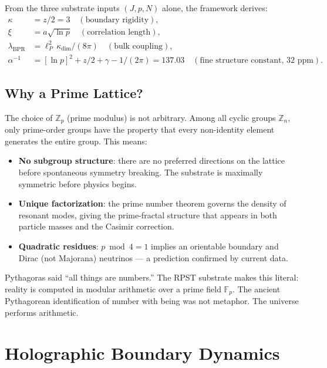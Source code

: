 \documentclass[12pt,oneside]{book}
\theoremstyle{definition}
\newcommand{\lP}{\ell_P}
\begin{document}
From the three substrate inputs $(J, p, N)$ alone, the framework derives:
\begin{align}
  \kappa &= z/2 = 3 \quad (\text{boundary rigidity}), \\
  \xi    &= a\sqrt{\ln p} \quad (\text{correlation length}), \\
  \lambda_{\mathrm{BPR}} &= \lP^2\,\kappa_{\mathrm{dim}}/(8\pi) \quad
                            (\text{bulk coupling}), \\
  \alpha^{-1} &= [\ln p]^2 + z/2 + \gamma - 1/(2\pi)
               = 137.03 \quad (\text{fine structure constant, 32~ppm}).
\end{align}

\section{Why a Prime Lattice?}

The choice of $\mathbb{Z}_p$ (prime modulus) is not arbitrary. Among all cyclic
groups $\mathbb{Z}_n$, only prime-order groups have the property that every
non-identity element generates the entire group. This means:

\begin{itemize}
  \item \textbf{No subgroup structure}: there are no preferred directions on the
    lattice before spontaneous symmetry breaking. The substrate is maximally
    symmetric before physics begins.
  \item \textbf{Unique factorization}: the prime number theorem governs the
    density of resonant modes, giving the prime-fractal structure that appears
    in both particle masses and the Casimir correction.
  \item \textbf{Quadratic residues}: $p \bmod 4 = 1$ implies an orientable boundary
    and Dirac (not Majorana) neutrinos --- a prediction confirmed by current data.
\end{itemize}

\begin{resonance}
Pythagoras said ``all things are numbers.'' The RPST substrate makes this literal:
reality is computed in modular arithmetic over a prime field $\mathbb{F}_p$. The
ancient Pythagorean identification of number with being was not metaphor. The
universe performs arithmetic.
\end{resonance}

\chapter{Holographic Boundary Dynamics}
\label{chap:holographic}
\end{document}
